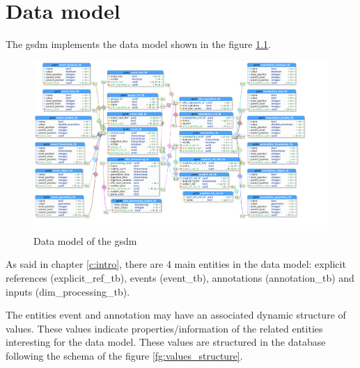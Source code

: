 \chapter{Data model}

The \acrshort{gsdm} implements the data model shown in the figure \ref{fg:gsdmdb}.

\begin{figure}[H]
  \begin{center}
	\centering\includegraphics[width=150mm]{../fig/gsdmdb.png}
	\caption{Data model of the \acrshort{gsdm}}
	\label{fg:gsdmdb}
  \end{center}
\end{figure}

As said in chapter \ref{c:intro}, there are 4 main entities in the data model: explicit references (explicit\_ref\_tb), events (event\_tb), annotations (annotation\_tb) and inputs (dim\_processing\_tb).

The entities event and annotation may have an associated dynamic structure of values. These values indicate properties/information of the related entities interesting for the data model. These values are structured in the database following the schema of the figure \ref{fg:values_structure}.

